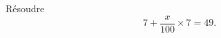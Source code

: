 
\begin{exercice}\label{exoSeconde-0066}

    Résoudre
    \begin{equation}
        7+\frac{ x }{ 100 }\times 7=49.
    \end{equation}

\end{exercice}
